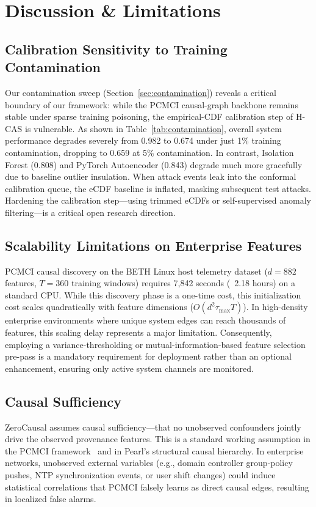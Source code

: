 \section{Discussion \& Limitations}
\label{sec:discussion}

\subsection{Calibration Sensitivity to Training Contamination}
Our contamination sweep (Section~\ref{sec:contamination}) reveals a critical boundary of our framework: while the PCMCI causal-graph backbone remains stable under sparse training poisoning, the empirical-CDF calibration step of H-CAS is vulnerable. As shown in Table~\ref{tab:contamination}, overall system performance degrades severely from 0.982 to 0.674 under just 1\% training contamination, dropping to 0.659 at 5\% contamination. In contrast, Isolation Forest (0.808) and PyTorch Autoencoder (0.843) degrade much more gracefully due to baseline outlier insulation. When attack events leak into the conformal calibration queue, the eCDF baseline is inflated, masking subsequent test attacks. Hardening the calibration step—using trimmed eCDFs or self-supervised anomaly filtering—is a critical open research direction.

\subsection{Scalability Limitations on Enterprise Features}
PCMCI causal discovery on the BETH Linux host telemetry dataset ($d = 882$ features, $T = 360$ training windows) requires 7,842 seconds (~2.18 hours) on a standard CPU. While this discovery phase is a one-time cost, this initialization cost scales quadratically with feature dimensions ($O(d^2 \tau_{\max} T)$). In high-density enterprise environments where unique system edges can reach thousands of features, this scaling delay represents a major limitation. Consequently, employing a variance-thresholding or mutual-information-based feature selection pre-pass is a mandatory requirement for deployment rather than an optional enhancement, ensuring only active system channels are monitored.

\subsection{Causal Sufficiency}
ZeroCausal assumes causal sufficiency---that no unobserved confounders jointly drive the observed provenance features. This is a standard working assumption in the PCMCI framework~\cite{pcmci2019} and in Pearl's structural causal hierarchy. In enterprise networks, unobserved external variables (e.g., domain controller group-policy pushes, NTP synchronization events, or user shift changes) could induce statistical correlations that PCMCI falsely learns as direct causal edges, resulting in localized false alarms.

